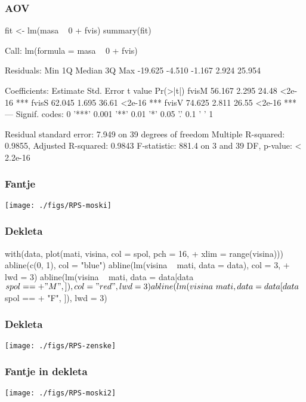 \begin{frame}[fragile]
\frametitle{AOV}
\begin{Schunk}
\begin{Sinput}
  fit <- lm(masa ~ 0 + fvis)
  summary(fit)
\end{Sinput}
\begin{Soutput}
Call:
lm(formula = masa ~ 0 + fvis)

Residuals:
    Min      1Q  Median      3Q     Max 
-19.625  -4.510  -1.167   2.924  25.954 

Coefficients:
      Estimate Std. Error t value Pr(>|t|)    
fvisM   56.167      2.295   24.48   <2e-16 ***
fvisS   62.045      1.695   36.61   <2e-16 ***
fvisV   74.625      2.811   26.55   <2e-16 ***
---
Signif. codes:  0 '***' 0.001 '**' 0.01 '*' 0.05 '.' 0.1 ' ' 1 

Residual standard error: 7.949 on 39 degrees of freedom
Multiple R-squared: 0.9855,	Adjusted R-squared: 0.9843 
F-statistic: 881.4 on 3 and 39 DF,  p-value: < 2.2e-16 
\end{Soutput}
\end{Schunk}
\end{frame}






\begin{frame}[fragile]
\frametitle{Fantje}
\texttt{[image: ./figs/RPS-moski]}
\end{frame}
\clearpage
\begin{frame}[fragile]
\frametitle{Dekleta}
\begin{Schunk}
\begin{Sinput}
  with(data, plot(mati, visina, col = spol, pch = 16, 
+     xlim = range(visina)))
  abline(c(0, 1), col = "blue")
  abline(lm(visina ~ mati, data = data), col = 3, 
+     lwd = 3)
  abline(lm(visina ~ mati, data = data[data$spol == 
+     "M", ]), col = "red", lwd = 3)
  abline(lm(visina ~ mati, data = data[data$spol == 
+     "F", ]), lwd = 3)
\end{Sinput}
\end{Schunk}
\end{frame}

\begin{frame}[fragile]
\frametitle{Dekleta}
\texttt{[image: ./figs/RPS-zenske]}
\end{frame}
\clearpage
{}
\begin{frame}[fragile]
\frametitle{Fantje in dekleta}
\texttt{[image: ./figs/RPS-moski2]}
\end{frame}



